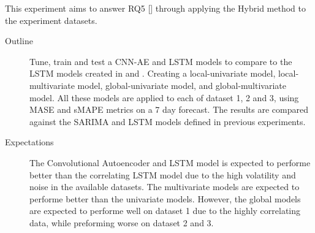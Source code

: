 This experiment aims to answer RQ5 [] through applying the Hybrid method
to the experiment datasets.


\begin{description}
  \item[Outline]{
              Tune, train and test a CNN-AE and LSTM models to compare to the LSTM models
              created in  and .
              Creating a local-univariate model, local-multivariate model, global-univariate model, and global-multivariate model.
              All these models are applied to each of dataset 1, 2 and 3, using MASE and sMAPE metrics on a 7 day forecast.
              The results are compared against the SARIMA and LSTM models defined in previous experiments.
        }
\end{description}

\begin{description}
  \item[Expectations]{
              The Convolutional Autoencoder and LSTM model is expected to performe better than the correlating LSTM model
              due to the high volatility and noise in the available datasets.
              The multivariate models are expected to performe better than the univariate models.
              However, the global models are expected to performe well on dataset 1 due to the highly correlating data,
              while preforming worse on dataset 2 and 3.
        }
\end{description}